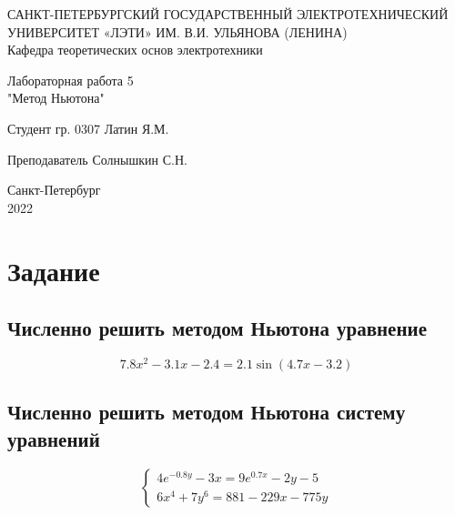 \documentclass[12pt,a4paper]{article}
\begin{document}
	
	\begin{titlepage}
		
		\begin{center}
			САНКТ-ПЕТЕРБУРГСКИЙ ГОСУДАРСТВЕННЫЙ ЭЛЕКТРОТЕХНИЧЕСКИЙ УНИВЕРСИТЕТ «ЛЭТИ» ИМ. В.И. УЛЬЯНОВА (ЛЕНИНА)\\
			\vspace{0.1cm}
			Кафедра теоретических основ электротехники\\
			
			
			
		\end{center}
		
		\vspace{5cm}
		\begin{center}
			\begin{large}
				Лабораторная работа 5 \\
				"Метод Ньютона"
			\end{large}
		\end{center}
		
		\vspace{5cm}
		
		\hspace{5cm} Студент гр.  0307 \hrulefill Латин Я.М.
		
		\vspace{0.5cm}
		\hspace{5cm} Преподаватель \hrulefill Солнышкин С.Н. \\
		
		
		\vfill
		\begin{center}
			Санкт-Петербург\\
			2022
		\end{center}
		
		
	\end{titlepage}
\tableofcontents
\newpage

\section{Задание}
\subsection{Численно решить методом Ньютона уравнение }
\begin{equation*}
 7.8x^2 -3.1x-2.4=2.1\sin(4.7x-3.2)
 \end{equation*}
\subsection{Численно решить методом Ньютона систему уравнений}
\begin{equation*}
	\begin{cases}
		4e^{-0.8y}-3x=9e^{0.7x}-2y-5
		\\
		6x^4+7y^6=881-229x-775y
	\end{cases}	
\end{equation*}
\end{document}
